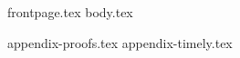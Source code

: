 \documentclass[11pt]{llncs}
\begin{document}
{frontpage.tex}
{body.tex}

\iflncs
  \thispagestyle{plain}
\fi

\ifccs
  
\fi
\iflncs
  
\fi
\ifoakland
  
\fi


\appendix
{appendix-proofs.tex}
\iflong
{appendix-timely.tex}
\fi
\end{document}
